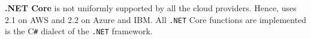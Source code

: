 
\textbf{.NET Core} is not uniformly supported by all the cloud providers. 
Hence, \sys uses 2.1 on \gls{AWS} and 2.2 on Azure and \gls{IBM}.
All \texttt{.NET} Core functions are implemented is the C\texttt{\#} dialect of the \texttt{.NET} framework.


